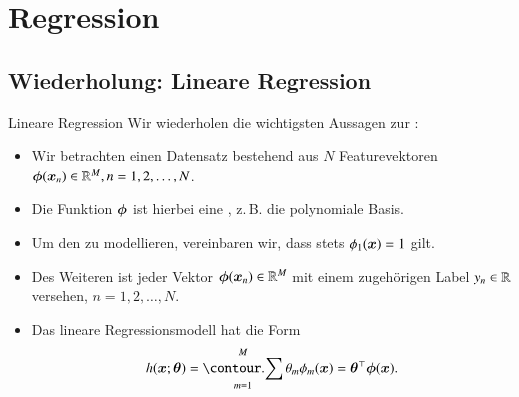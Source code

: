 \section{Regression}

\divider

\subsection{Wiederholung: Lineare Regression}

\begin{frame}{Lineare Regression}{}
	Wir wiederholen die wichtigsten Aussagen zur :

	\begin{itemize}
		\item Wir betrachten einen Datensatz bestehend aus $N$ Featurevektoren $\bm{\phi}(\bm{x}_n) \in \mathbb{R}^M, n = 1, 2, \ldots, N$.
		\item Die Funktion $\bm{\phi}$ ist hierbei eine , z.\,B. die polynomiale Basis.
		\item Um den  zu modellieren, vereinbaren wir, dass stets $\phi_1(\bm{x}) = 1$ gilt.
		\item Des Weiteren ist jeder Vektor $\bm{\phi}(\bm{x}_n) \in \mathbb{R}^M$ mit einem zugehörigen Label $y_n \in \mathbb{R}$ versehen, $n = 1, 2, \ldots, N$.
		\item Das lineare Regressionsmodell hat die Form
		\begin{equation*}
			h(\bx; \btheta) = \sum_{m=1}^M \theta_m \phi_m(\bx) = \btheta^\top \bphi(\bx).
		\end{equation*}
	\end{itemize}
\end{frame}


